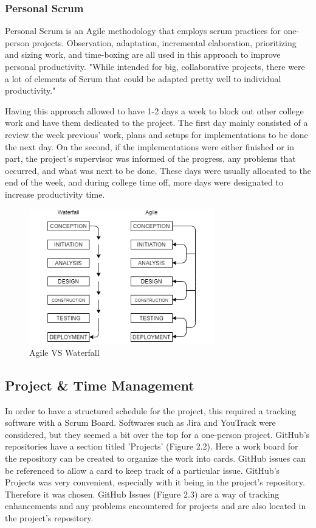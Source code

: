 \subsubsection{Personal Scrum}
Personal Scrum is an Agile methodology that employs scrum practices for one-person projects. Observation, adaptation, incremental elaboration, prioritizing and sizing work, and time-boxing are all used in this approach to improve personal productivity.
"While intended for big, collaborative projects, there were a lot of elements of Scrum that could be adapted pretty well to individual productivity." \cite{ref4}
 
Having this approach allowed to have 1-2 days a week to block out other college work and have them dedicated to the project. The first day mainly consisted of a review the week previous' work, plans and setups for implementations to be done the next day. On the second, if the implementations were either finished or in part, the project's supervisor was informed of the progress, any problems that occurred, and what was next to be done. These days were usually allocated to the end of the week, and during college time off, more days were designated to increase productivity time.

\begin{figure}[H]
    \caption{Agile VS Waterfall}
    \label{image:agileVSwaterfall}
    \centering
    \includegraphics[width=0.72\textwidth]{images/misc/agile-vs-waterfall.png}
\end{figure}

\subsection{Project \& Time Management}
In order to have a structured schedule for the project, this required a tracking software with a Scrum Board. Softwares such as Jira and YouTrack were considered, but they seemed a bit over the top for a one-person project. GitHub's repositories have a section titled 'Projects' (Figure 2.2). Here a work board for the repository can be created to organize the work into cards. GitHub issues can be referenced to allow a card to keep track of a particular issue. GitHub's Projects was very convenient, especially with it being in the project's repository. Therefore it was chosen. GitHub Issues (Figure 2.3) are a way of tracking enhancements and any problems encountered for projects and are also located in the project's repository.

